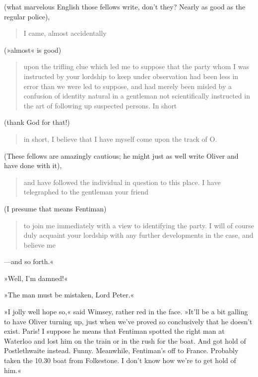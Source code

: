 (what marvelous English those fellows write, don't they? Nearly as good as the regular police), 

\begin{quotation}I came, almost accidentally\end{quotation} 

(»almost« is good) 

\begin{quotation}
	upon the trifling clue which led me to suppose that the party whom I was instructed by your lordship to keep under observation had been less in error than we were led to suppose, and had merely been misled by a confusion of identity natural in a gentleman not scientifically instructed in the art of following up suspected persons. In short
\end{quotation} 

(thank God for that!) 

\begin{quotation}
in short, I believe that I have myself come upon the track of O.
\end{quotation} 

(These fellows are amazingly cautious; he might just as well write Oliver and have done with it), 

\begin{quotation}
and have followed the individual in question to this place. I have telegraphed to the gentleman your friend
\end{quotation} 

(I presume that means Fentiman) 

\begin{quotation}to join me immediately with a view to identifying the party. I will of course duly acquaint your lordship with any further developments in the case, and believe me\end{quotation}—and so forth.«

»Well, I'm damned!«

»The man must be mistaken, Lord Peter.«

»I jolly well hope so,« said Wimsey, rather red in the face. »It'll be a bit galling to have Oliver turning up, just when we've proved so conclusively that he doesn't exist. Paris! I suppose he means that Fentiman spotted the right man at Waterloo and lost him on the train or in the rush for the boat. And got hold of Postlethwaite instead. Funny. Meanwhile, Fentiman's off to France. Probably taken the 10.30 boat from Folkestone. I don't know how we're to get hold of him.«

